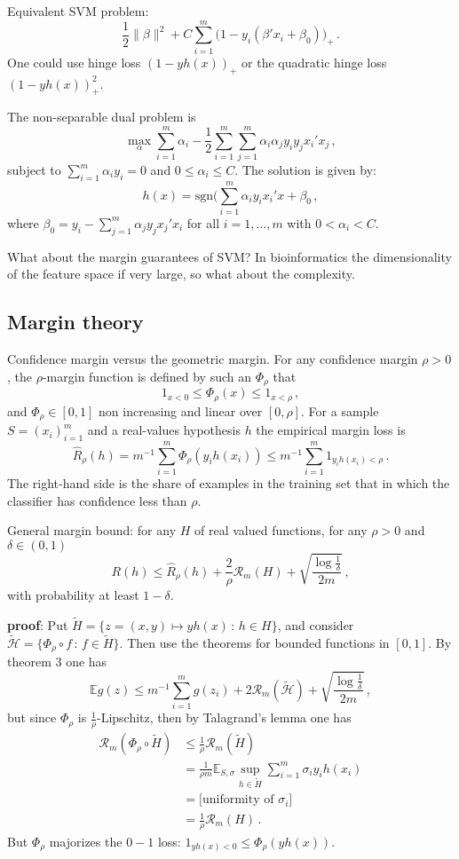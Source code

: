 \documentclass[a4paper]{article}
\newcommand{\ex}{\mathbb{E}}
\begin{document}
Equivalent SVM problem:
\[ \frac{1}{2}\|\beta\|^2 + C \sum_{i=1}^m \bigl(1-y_i(\beta'x_i + \beta_0)\bigr)_+ \,. \]
One could use hinge loss $(1-yh(x))_+$ or the quadratic hinge loss $(1-yh(x))_+^2$.

The non-separable dual problem is
\[\max_\alpha \sum_{i=1}^m \alpha_i - \frac{1}{2}\sum_{i=1}^m \sum_{j=1}^m \alpha_i \alpha_j y_i y_j x_i'x_j \,, \]
subject to $\sum_{i=1}^m \alpha_i y_i = 0$ and $0 \leq \alpha_i \leq C$. The solution
is given by:
\[ h(x) = \text{sgn}(\sum_{i=1}^m \alpha_i y_i x_i'x + \beta_0 \,,\]
where $\beta_0 = y_i - \sum_{j=1}^m \alpha_j y_j x_j'x_i$ for all $i=1,\ldots, m$
with $0 < \alpha_i < C$.

What about the margin guarantees of SVM? In bioinformatics the dimensionality of
the feature space if very large, so what about the complexity.


\subsection{Margin theory} %
\label{sub:margin_theory}
Confidence margin versus the geometric margin. For any confidence margin $\rho>0$,
the $\rho$-margin function is defined by such an $\Phi_\rho$ that
\[ 1_{x < 0} \leq \Phi_\rho(x) \leq 1_{x < \rho} \,,\]
and $\Phi_\rho \in [0,1]$ non increasing and linear over $[0, \rho]$. For a sample
$S = (x_i)_{i=1}^m$ and a real-values hypothesis $h$ the empirical margin loss is
\[\hat{R}_\rho(h)
    = m^{-1} \sum_{i=1}^m \Phi_\rho(y_i h(x_i))
    \leq m^{-1} \sum_{i=1}^m 1_{y_i h(x_i) < \rho}
    \,. \]
The right-hand side is the share of examples in the training set that in which the
classifier has confidence less than $\rho$.

General margin bound: for any $H$ of real valued functions, for any $\rho>0$ and
$\delta\in(0,1)$
\[ R(h)
    \leq \hat{R}_\rho(h) + \frac{2}{\rho} \mathcal{R}_m(H)
    + \sqrt{\frac{\log\frac{1}{\delta}}{2m}}
    \,, \]
with probability at least $1-\delta$.

\textbf{proof}: Put $\tilde{H} = \{z = (x,y) \mapsto yh(x) \,:\, h\in H\}$, and
consider $\tilde{\mathcal{H}} = \{\Phi_\rho \circ f\,:\, f\in \tilde{H}\}$.
Then use the theorems for bounded functions in $[0,1]$.
By theorem 3 one has
\[ \ex g(z) \leq m^{-1} \sum_{i=1}^m g(z_i)
            + 2\mathcal{R}_m(\tilde{\mathcal{H}}) + \sqrt{\frac{\log\frac{1}{\delta}}{2m}}
    \,,\]
but since $\Phi_\rho$ is $\frac{1}{\rho}$-Lipschitz, then by Talagrand's lemma one
has
\begin{align*}
    \mathcal{R}_m(\Phi_\rho\circ \tilde{H})
    &\leq \frac{1}{\rho} \mathcal{R}_m(\tilde{H}) \\
    &= \frac{1}{\rho m} \ex_{S,\sigma} \sup_{h\in \tilde{H}} \sum_{i=1}^m \sigma_i y_i h(x_i) \\
    &=\bigl[\text{uniformity of } \sigma_i \bigr] \\
    &= \frac{1}{\rho} \mathcal{R}_m(H) \,.
\end{align*}
But $\Phi_\rho$ majorizes the $0-1$ loss: $1_{yh(x) < 0} \leq \Phi_\rho(yh(x))$.
\end{document}
